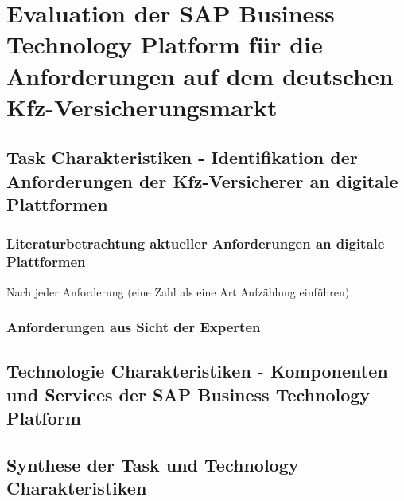 \chapter{Evaluation der SAP Business Technology Platform für die Anforderungen auf dem deutschen Kfz-Versicherungsmarkt}

\section{Task Charakteristiken - Identifikation der Anforderungen der Kfz-Versicherer an digitale Plattformen}

\subsection{Literaturbetrachtung aktueller Anforderungen an digitale Plattformen}

Nach jeder Anforderung (eine Zahl als eine Art Aufzählung einführen)



\subsection{Anforderungen aus Sicht der Experten}

\section{Technologie Charakteristiken - Komponenten und Services der SAP Business Technology Platform}

\section{Synthese der Task und Technology Charakteristiken}


